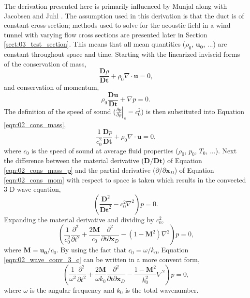 The derivation presented here is primarily influenced by Munjal \cite{Munjal-2014-w28y4EyP} along with Jacobsen and Juhl \cite{Jacobsen-2013-PHD3v3YZ}.
The assumption used in this derivation is that the duct is of constant cross-section;
methods used to solve for the acoustic field in a wind tunnel with varying flow cross sections are presented later in Section \ref{sect:03_test_section}.
This means that all mean quantities ($\rho_0$, $\mathbf{u_0}$, ...) are constant throughout space and time.
Starting with the linearized inviscid forms of the conservation of mass,
\begin{equation}
  \frac{\mathbf{D}\rho}{\mathbf{Dt}} + \rho_0\nabla\cdot\mathbf{u} = 0 \textrm{,}
  \label{eqn:02_cons_mass}
\end{equation}
and conservation of momentum,
\begin{equation}
  \rho_0\frac{\mathbf{Du}}{\mathbf{Dt}} + \nabla p = 0 \textrm{.}
  \label{eqn:02_cons_mom}
\end{equation}
The definition of the speed of sound ($\left.\frac{\partial p}{\partial\rho}\right|_s = c_0^2$) is then substituted into Equation \ref{eqn:02_cons_mass},
\begin{equation}
  \frac{1}{c_0^2}\frac{\mathbf{D}p}{\mathbf{Dt}} + \rho_0\nabla\cdot\mathbf{u} = 0 \textrm{,}
  \label{eqn:02_cons_mass_p}
\end{equation}
where $c_0$ is the speed of sound at average fluid properties ($\rho_0$, $p_0$, $T_0$, ...).
Next the difference between the material derivative ($\mathbf{D}/\mathbf{Dt}$) of Equation \ref{eqn:02_cons_mass_p} and the partial derivative ($\partial/\partial\mathbf{x}_D$) of Equation \ref{eqn:02_cons_mom} with respect to space is taken which results in the convected 3-D wave equation,
\begin{equation}
  \left(\frac{\mathbf{D}^2}{\mathbf{Dt}^2}-c_0^2\nabla^2\right)p=0\textrm{.}
  \label{eqn:02_wave_conv_3_c}
\end{equation}
Expanding the material derivative and dividing by $c_0^2$,
\begin{equation}
  \left(\frac{1}{c_0^2}\frac{\partial^2}{\partial t^2} + \frac{2\mathbf{M}}{c_0}\frac{\partial^2}{\partial t\partial\mathbf{x}_D} - (1-\mathbf{M}^2)\nabla^2\right)p = 0 \textrm{,}
  \label{eqn:02_wave_conv_expand}
\end{equation}
where $\mathbf{M} = \mathbf{u_0}/c_0$.
By using the fact that $c_0=\omega/k_0$, Equation \ref{eqn:02_wave_conv_3_c} can be written in a more convent form,
\begin{equation}
  \left(\frac{1}{\omega^2}\frac{\partial^2}{\partial t^2} + \frac{2\mathbf{M}}{\omega k_0}\frac{\partial^2}{\partial t\partial\mathbf{x}_D} - \frac{1-\mathbf{M}^2}{k_0^2}\nabla^2\right)p = 0 \textrm{,}
  \label{eqn:02_wave_conv_3}
\end{equation}
where $\omega$ is the angular frequency and $k_0$ is the total wavenumber.

